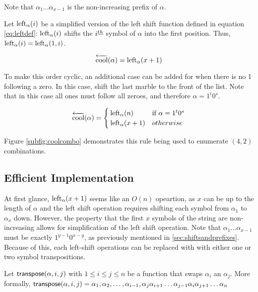  Note that $\alpha_1...\alpha_{x-1}$ is the non-increasing prefix of $\alpha$.

 Let $\leftshift[\alpha]{i}$ be a simplified version of the left shift function defined in equation \ref{eq:leftdef}:  $\leftshift[\alpha]{i}$ shifts the $i\thh$ symbol of $\alpha$ into the first position.  Thus, $\leftshift[\alpha]{i}=\lshiftindex[\alpha]{1}{i}$.

 \begin{equation} \label{eq:coolCombo}
     \overleftarrow{\text{cool}}(\alpha) = \leftshift[\alpha]{x+1}
 \end{equation}

 To make this order cyclic, an additional case can be added for when there is no 1 following a zero. In this case, shift the last marble to the front of the list. Note that in this case all ones must follow all zeroes, and therefore $\alpha=1^t0^s$.  

\begin{equation}\label{eq:coolComboCyclic}
    \overleftarrow{\text{cool}}(\alpha) = \begin{cases}
	\leftshift[\alpha]{n} & \text{if } \alpha=1^t0^s \\
	\leftshift[\alpha]{x+1} & otherwise
\end{cases}
\end{equation}


Figure \ref{subfig:coolcombo} demonstrates this rule being used to enumerate $(4,2)$ combinations.

\subsection{Efficient Implementation}

At first glance, $\leftshift[\alpha]{x+1}$ seems like an $O(n)$ opeartion, as $x$ can be up to the length of $\alpha$ and the left shift operation requires shifting each symbol from $\alpha_1$ to $\alpha_{x}$ down.  However, 
the property that the first $x$ symbols of the string are non-increasing allows for simplification of the left shift operation. Note that $\alpha_1...\alpha_{x-1}$ must be exactly $1^{y-1}0^{x-y}$, as previously mentioned in \ref{sec:shiftsandprefixes}. Because of this, each left-shift operations can be replaced with with either one or two symbol transpositions. 

 Let $\transpose{\alpha}{i}{j}$ with $1 \le i \le j \le n$ be a function that swaps $\alpha_i$ an $\alpha_j$.  More formally, $\transpose{\alpha}{i}{j}=\alpha_1,\alpha_2,\dots,\alpha_{i-1},\alpha_{j}\alpha_{i+1}\dots \alpha_{j-1}\alpha_i \alpha_{j+1}\dots \alpha_n$

